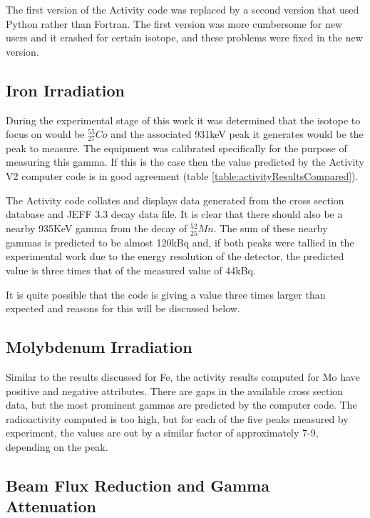 The first version of the Activity code was replaced by a second version that used Python rather than Fortran.  The first version was more cumbersome for new users and it crashed for certain isotope, and these problems were fixed in the new version.



\subsection{Iron Irradiation}

During the experimental stage of this work it was determined that the isotope to focus on would be ${}^{55}_{27} Co$ and the associated 931keV peak it generates would be the peak to measure.  The equipment was calibrated specifically for the purpose of measuring this gamma.  If this is the case then the value predicted by the Activity V2 computer code is in good agreement (table \ref{table:activityResultsCompared}). 

The Activity code collates and displays data generated from the cross section database and JEFF 3.3 decay data file.  It is clear that there should also be a nearby 935KeV gamma from the decay of ${}^{52}_{25}Mn$.  The sum of these nearby gammas is predicted to be almost 120kBq and, if both peaks were tallied in the experimental work due to the energy resolution of the detector, the predicted value is three times that of the measured value of 44kBq.

It is quite possible that the code is giving a value three times larger than expected and reasons for this will be discussed below.


\subsection{Molybdenum Irradiation}
\label{section:moirradiation}

Similar to the results discussed for Fe, the activity results computed for \Gls{Mo} have positive and negative attributes.  There are gaps in the available cross section data, but the most prominent gammas are predicted by the computer code.  The radioactivity computed is too high, but for each of the five peaks measured by experiment, the values are out by a similar factor of approximately 7-9, depending on the peak.


\subsection{Beam Flux Reduction and Gamma Attenuation}

